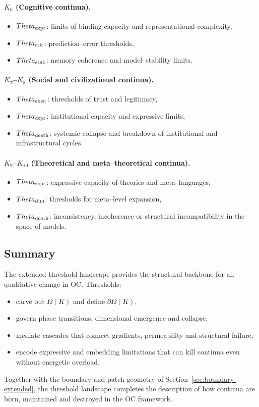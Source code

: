 \paragraph{\texorpdfstring{\(K_6\)}{K_6} (Cognitive continua).}
\begin{itemize}
    \item \(\Theta_{\rm expr}\): limits of binding capacity and representational
          complexity,
    \item \(\Theta_{\rm crit}\): prediction–error thresholds,
    \item \(\Theta_{\rm stab}\): memory coherence and model–stability limits.
\end{itemize}

\paragraph{\texorpdfstring{\(K_7\)}{K_7}–\texorpdfstring{\(K_8\)}{K_8} (Social and civilizational continua).}
\begin{itemize}
    \item \(\Theta_{\rm exist}\): thresholds of trust and legitimacy,
    \item \(\Theta_{\rm expr}\): institutional capacity and expressive limits,
    \item \(\Theta_{\rm death}\): systemic collapse and breakdown of
          institutional and infrastructural cycles.
\end{itemize}

\paragraph{\texorpdfstring{\(K_9\)}{K_9}–\(K_{10}\) (Theoretical and meta–theoretical continua).}
\begin{itemize}
    \item \(\Theta_{\rm expr}\): expressive capacity of theories and
          meta–languages,
    \item \(\Theta_{\rm dim}\): thresholds for meta–level expansion,
    \item \(\Theta_{\rm death}\): inconsistency, incoherence or structural
          incompatibility in the space of models.
\end{itemize}

\subsection{Summary}

The extended threshold landscape provides the structural backbone for all
qualitative change in OC. Thresholds:
\begin{itemize}
    \item carve out \(\Omega(K)\) and define \(\partial\Omega(K)\),
    \item govern phase transitions, dimensional emergence and collapse,
    \item mediate cascades that connect gradients, permeability and structural
          failure,
    \item encode expressive and embedding limitations that can kill continua
          even without energetic overload.
\end{itemize}

Together with the boundary and patch geometry of
Section~\ref{sec:boundary-extended}, the threshold landscape completes the
description of how continua are born, maintained and destroyed in the OC
framework.
